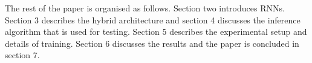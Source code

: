 \documentclass{article}
\begin{document}
The rest of the paper is organised as follows. Section two introduces RNNs. Section 3 describes the hybrid architecture and section 4 discusses the inference algorithm that is used for testing. Section 5 describes the experimental setup and details of training. Section 6 discusses the results and the paper is concluded in section 7. 




 
\end{document}
